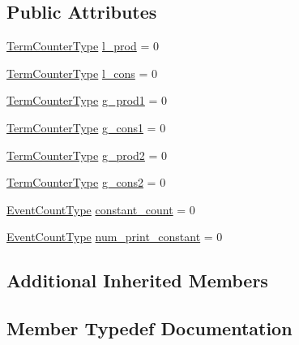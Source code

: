 \subsection*{Public Attributes}
\begin{DoxyCompactItemize}
\item 
\hyperlink{namespacevt_1_1term_a4fd378cdb0c36683afc1b3399d685f7f}{Term\+Counter\+Type} \hyperlink{structvt_1_1term_1_1_term_state_afec657b7e75164bdc75f464dd4dbe13b}{l\+\_\+prod} = 0
\item 
\hyperlink{namespacevt_1_1term_a4fd378cdb0c36683afc1b3399d685f7f}{Term\+Counter\+Type} \hyperlink{structvt_1_1term_1_1_term_state_a4f44e5ddcb585df5ad215f10bc195d4c}{l\+\_\+cons} = 0
\item 
\hyperlink{namespacevt_1_1term_a4fd378cdb0c36683afc1b3399d685f7f}{Term\+Counter\+Type} \hyperlink{structvt_1_1term_1_1_term_state_a75ab01f0dcceb86687a3e26edada0620}{g\+\_\+prod1} = 0
\item 
\hyperlink{namespacevt_1_1term_a4fd378cdb0c36683afc1b3399d685f7f}{Term\+Counter\+Type} \hyperlink{structvt_1_1term_1_1_term_state_a91952f12d457df3a7e5f634957e9cbd7}{g\+\_\+cons1} = 0
\item 
\hyperlink{namespacevt_1_1term_a4fd378cdb0c36683afc1b3399d685f7f}{Term\+Counter\+Type} \hyperlink{structvt_1_1term_1_1_term_state_a5e7029af1dca0645c92f5a00316dc039}{g\+\_\+prod2} = 0
\item 
\hyperlink{namespacevt_1_1term_a4fd378cdb0c36683afc1b3399d685f7f}{Term\+Counter\+Type} \hyperlink{structvt_1_1term_1_1_term_state_aaaf3c5cec9c925c420082bb284a5a78e}{g\+\_\+cons2} = 0
\item 
\hyperlink{structvt_1_1term_1_1_term_state_a900fe4e9d98c81a320ae1dca27b71c2c}{Event\+Count\+Type} \hyperlink{structvt_1_1term_1_1_term_state_ae200479dfa6c38aa5d09ac6824fe2f49}{constant\+\_\+count} = 0
\item 
\hyperlink{structvt_1_1term_1_1_term_state_a900fe4e9d98c81a320ae1dca27b71c2c}{Event\+Count\+Type} \hyperlink{structvt_1_1term_1_1_term_state_ac3289ddbfa5c385c4d91d240bc17d67f}{num\+\_\+print\+\_\+constant} = 0
\end{DoxyCompactItemize}
\subsection*{Additional Inherited Members}


\subsection{Member Typedef Documentation}
\mbox{\label{structvt_1_1term_1_1_term_state_a900fe4e9d98c81a320ae1dca27b71c2c}} 
